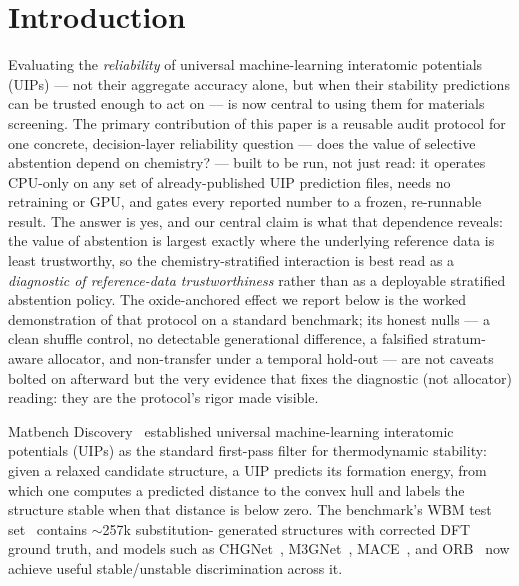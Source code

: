 \documentclass[11pt]{article}
\begin{document}
\begin{abstract}
$n{=}16$ per arm rather than a demonstrated invariance); a prior Orb-v3
reversal arose from an earlier prediction reconstruction and was corrected to $+0.64$. Scoping the claim: the
oxide-highest ordering is a pooled-evaluation property that does not transfer under a temporally
held-out split, and a stratum-aware knapsack allocator is falsified --- the clean shuffle null,
this generational equivalence, and the non-transfer are the protocol's built-in controls doing
their job, not the effect weakening, and what they jointly certify is an \emph{abstention-quality}
interaction at matched yield, not a model-ranking re-ordering.
\end{abstract}

\section{Introduction}

Evaluating the \emph{reliability} of universal machine-learning interatomic potentials (UIPs)
--- not their aggregate accuracy alone, but when their stability predictions can be trusted
enough to act on --- is now central to using them for materials screening. The primary
contribution of this paper is a reusable audit protocol for one concrete, decision-layer
reliability question --- does the value of selective abstention depend on chemistry? --- built
to be run, not just read: it operates CPU-only on any set of already-published UIP prediction
files, needs no retraining or GPU, and gates every reported number to a frozen, re-runnable
result. The answer is yes, and our central claim is what that dependence reveals: the value of
abstention is largest exactly where the underlying reference data is least trustworthy, so the
chemistry-stratified interaction is best read as a \emph{diagnostic of reference-data
trustworthiness} rather than as a deployable stratified abstention policy. The oxide-anchored
effect we report below is the worked demonstration of that protocol on a standard benchmark; its
honest nulls --- a clean shuffle control, no detectable generational difference, a falsified
stratum-aware allocator, and non-transfer under a temporal hold-out --- are not caveats bolted
on afterward but the very evidence that fixes the diagnostic (not allocator) reading: they are
the protocol's rigor made visible.

Matbench Discovery~\citep{riebesell2025} established universal machine-learning interatomic
potentials (UIPs) as the standard first-pass filter for thermodynamic stability: given a
relaxed candidate structure, a UIP predicts its formation energy, from which one computes a
predicted distance to the convex hull and labels the structure stable when that distance is
below zero. The benchmark's WBM test set~\citep{wang2021} contains $\sim$257k substitution-
generated structures with corrected DFT ground truth, and models such as
CHGNet~\citep{deng2023}, M3GNet~\citep{chen2022}, MACE~\citep{batatia2022mace}, and
ORB~\citep{neumann2024} now achieve useful stable/unstable discrimination across it.
\end{document}
